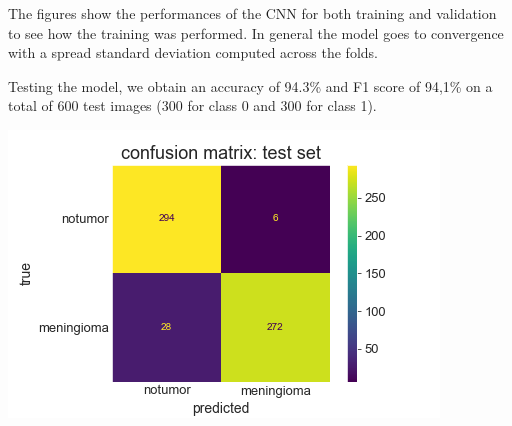 \documentclass[11pt]{article}
\newenvironment{Figure}
  {\par\medskip\noindent\minipage{\linewidth}}
  {\endminipage\par\medskip}
\begin{document}
\begin{multicols*}{2}
The figures show the performances of the CNN for both training and validation to see how the training was performed. In general the model goes to convergence with a spread standard deviation computed across the folds.

Testing the model, we obtain an accuracy of 94.3\% and F1 score of 94,1\% on a total of 600 test images (300 for class 0 and 300 for class 1).

\begin{Figure}
    \centering
    \includegraphics[width=0.75\linewidth]{images/CNN_ConfusionMatrix.png}
    \label{fig:cnn-confusion}
\end{Figure}


\end{multicols*}
\end{document}
